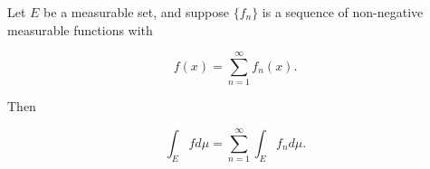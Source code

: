 Let $E$ be a measurable set, and suppose $\{f_n\}$ is a sequence of non-negative measurable functions with

$$f(x) = \sum_{n=1}^{\infty} f_n(x).$$

Then

$$\int_E f d\mu = \sum_{n=1}^{\infty} \int_E f_n d\mu.$$
